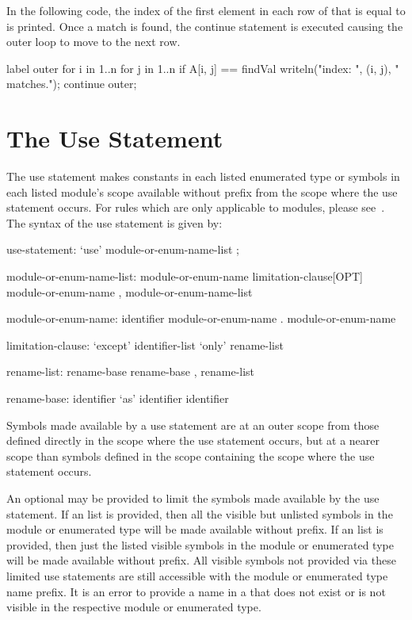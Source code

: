 \begin{example}
In the following code, the index of the first element in each row of
 that is equal to  is printed.  Once a match is
found, the continue statement is executed causing the outer loop to
move to the next row.
\begin{chapel}
label outer for i in 1..n {
  for j in 1..n {
    if A[i, j] == findVal {
      writeln("index: ", (i, j), " matches.");
      continue outer;
    }
  }
}
\end{chapel}
\end{example}

\section{The Use Statement}
\label{The_Use_Statement}

The use statement makes constants in each listed enumerated type or symbols in
each listed module's scope available without prefix from the scope where the use
statement occurs.  For rules which are only applicable to modules, please
see~.  The syntax of the use statement is given by:

\begin{syntax}
use-statement:
  `use' module-or-enum-name-list ;

module-or-enum-name-list:
  module-or-enum-name limitation-clause[OPT]
  module-or-enum-name , module-or-enum-name-list

module-or-enum-name:
  identifier
  module-or-enum-name . module-or-enum-name

limitation-clause:
  `except' identifier-list
  `only' rename-list

rename-list:
  rename-base
  rename-base , rename-list

rename-base:
  identifier `as' identifier
  identifier
\end{syntax}

Symbols made available by a use statement are at an outer scope from those
defined directly in the scope where the use statement occurs, but at a
nearer scope than symbols defined in the scope containing the scope where
the use statement occurs.

An optional  may be provided to limit the symbols made
available by the use statement.  If an  list is provided, then all
the visible but unlisted symbols in the module or enumerated type will be made
available without prefix.  If an  list is provided, then just the
listed visible symbols in the module or enumerated type will be made available
without prefix.  All visible symbols not provided via these limited use
statements are still accessible with the module or enumerated type name prefix.
It is an error to provide a name in a  that does not
exist or is not visible in the respective module or enumerated type.

